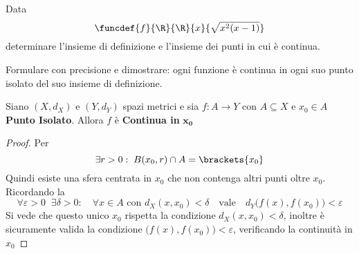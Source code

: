 \begin{exercise}
	Data
	\[\funcdef{f}{\R}{\R}{x}{\sqrt{x^2(x-1)}}\]
	determinare l'insieme di definizione e l'insieme dei punti in cui è continua.
\end{exercise}
\begin{exercise}
	\label{ex:f_cont_in_pto_isol}
	Formulare con precisione e dimostrare: ogni funzione è continua in ogni suo punto isolato del suo insieme di definizione.
	\begin{solution}
		\renewcommand\qedsymbol{$\square$} %
		Siano $(X,d_X)$ e $(Y,d_Y)$ spazi metrici e sia $f: A \to Y$ con $A \subseteq X$ e $x_0 \in A$ \textbf{Punto Isolato}. Allora $f$ è \textbf{Continua in} $\boldsymbol{x_0}$
		\begin{proof}
			\let\qed\relax %
			Per 
			\[\exists r > 0:\; B(x_0, r) \cap A = \brackets{x_0}\]
			Quindi esiste una sfera centrata in $x_0$ che non contenga altri punti oltre $x_0$.
			Ricordando la 
			\[\forall \varepsilon > 0\;\;\exists \delta > 0:\quad \forall x \in A \text{ con } d_X(x,x_0)<\delta \quad \text{vale} \quad d_Y \bigl(f(x),f(x_0)\bigr) < \varepsilon\]
			Si vede che questo unico $x_0$ rispetta la condizione $d_X(x,x_0)<\delta$, inoltre è sicuramente valida la condizione $\bigl(f(x),f(x_0)\bigr) < \varepsilon$, verificando la continuità in $x_0$
		\end{proof}
	\end{solution}
\end{exercise}

